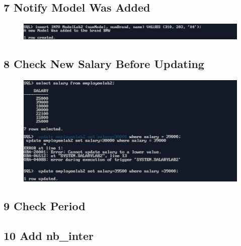 \vspace{0.5cm}

\subsection*{7 Notify Model Was Added}



\vspace{0.25cm}
\begin{figure}[ht]
    \centering
    \includegraphics[width=\textwidth]{SQL/examples/PLSQL/EX1/PNG/ex8.png}
\end{figure}

\vspace{0.5cm}
\newpage
\subsection*{8 Check New Salary Before Updating}



\vspace{0.25cm}
\begin{figure}[ht]
    \centering
    \includegraphics[width=\textwidth]{SQL/examples/PLSQL/EX1/PNG/ex9.png}
\end{figure}

\newpage
\subsection*{9 Check Period}



\subsection*{10 Add nb\_inter}

